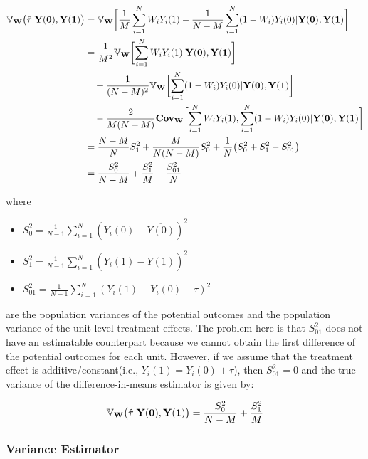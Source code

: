 \begin{align}
    {\mathbb{V}}_\mathbf{W}\bigl(\hat\tau | \mathbf{Y(0),Y(1)}\bigr) &= {\mathbb{V}}_\mathbf{W}\biggl[\frac{1}{M}\sum_{i=1}^N W_iY_i(1) - \frac{1}{N-M}\sum_{i=1}^N (1-W_i)Y_i(0)| \mathbf{Y(0),Y(1)}\biggr]\\
    &= \frac{1}{M^2} {\mathbb{V}}_\mathbf{W}\biggl[\sum_{i=1}^N W_iY_i(1)| \mathbf{Y(0),Y(1)}\biggr] \notag\\
    &\quad + \frac{1}{(N-M)^2} {\mathbb{V}}_\mathbf{W}\biggl[\sum_{i=1}^N (1-W_i)Y_i(0)| \mathbf{Y(0),Y(1)}\biggr] \notag\\
    &\quad - \frac{2}{M(N-M)} \mathbf{Cov}_\mathbf{W}\biggl[\sum_{i=1}^N W_iY_i(1), \sum_{i=1}^N (1-W_i)Y_i(0)| \mathbf{Y(0),Y(1)}\biggr]\\
    &= \frac{N-M}{N}S_1^2 + \frac{M}{N(N-M)}S_0^2 + \frac{1}{N}\bigl(S_0^2 + S_1^2 - S_{01}^2\bigr)\\
    &= \frac{S_0^2}{N-M} + \frac{S_1^2}{M} - \frac{S_{01}^2}{N}
\end{align}

where 

\begin{itemize}
    \item $S_0^2 = \frac{1}{N-1} \sum_{i=1}^N (Y_i(0) - \overline{Y(0)})^2$
    \item $S_1^2 = \frac{1}{N-1} \sum_{i=1}^N (Y_i(1) - \overline{Y(1)})^2$
    \item $S_{01}^2 = \frac{1}{N-1} \sum_{i=1}^N (Y_i(1) - Y_i(0) - \tau)^2$
\end{itemize}

are the population variances of the potential outcomes and the population variance of the unit-level treatment effects.
The problem here is that $S_{01}^2$ does not have an estimatable counterpart because we cannot obtain the first difference of the potential outcomes for each unit.
However, if we assume that the treatment effect is additive/constant(i.e., $Y_i(1) = Y_i(0) + \tau$), then $S_{01}^2 = 0$ and the true variance of the difference-in-means estimator is given by:

\begin{align}
    {\mathbb{V}}_\mathbf{W}\bigl(\hat\tau | \mathbf{Y(0),Y(1)}\bigr) = \frac{S_0^2}{N-M} + \frac{S_1^2}{M}
\end{align}

\subsubsection{Variance Estimator}

